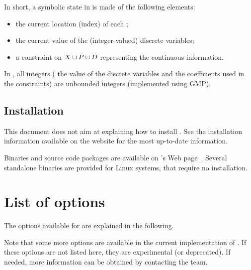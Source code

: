 
In short, a symbolic state in \imitator{} is made of the following elements:
\begin{itemize}
	\item the current location (index) of each \IPTA{};
	\item the current value of the (integer-valued) discrete variables;
	\item a constraint on $X \cup P \cup D$ representing the continuous information.
\end{itemize}
In \imitator{}, all integers (\ie{} the value of the discrete variables and the coefficients used in the constraints) are unbounded integers (implemented using GMP).



\section{Installation}

This document does not aim at explaining how to install \imitator{}.
See the installation information available on the website for the most up-to-date information.

Binaries and source code packages are available on \imitator{}'s Web page~\cite{imitator}.
Several standalone binaries are provided for Linux systems, that require no installation.








\chapter{List of options}\label{chapter:options}

The options available for \imitator{} are explained in the following.

Note that some more options are available in the current implementation of \imitator{}.
If these options are not listed here, they are experimental (or deprecated).
If needed, more information can be obtained by contacting the \imitator{} team.


